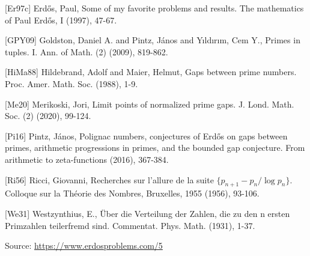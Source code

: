 \documentclass{article}
\begin{document}
 [Er97c] Erd\H{o}s, Paul, Some of my favorite problems and results. The mathematics of Paul Erd\H{o}s, I (1997), 47-67.
 
 [GPY09] Goldston, Daniel A. and Pintz, J\'{a}nos and Y\i ld\i r\i m, Cem Y., Primes in tuples. I. Ann. of Math. (2) (2009), 819-862.
 
 [HiMa88] Hildebrand, Adolf and Maier, Helmut, Gaps between prime numbers. Proc. Amer. Math. Soc. (1988), 1-9.
 
 [Me20] Merikoski, Jori, Limit points of normalized prime gaps. J. Lond. Math. Soc. (2) (2020), 99-124.
 
 [Pi16] Pintz, J\'{a}nos, Polignac numbers, conjectures of Erd\H{o}s on gaps between primes, arithmetic progressions in primes, and the bounded gap conjecture. From arithmetic to zeta-functions (2016), 367-384.
 
 [Ri56] Ricci, Giovanni, Recherches sur l'allure de la suite $\{p_{n+1}-p_n/\log p_n\}$. Colloque sur la Th\'{e}orie des Nombres, Bruxelles, 1955 (1956), 93-106.
 
 [We31] Westzynthius, E., \"{U}ber die Verteilung der Zahlen, die zu den n ersten Primzahlen teilerfremd sind. Commentat. Phys. Math. (1931), 1-37.

\bigskip
\noindent\small{Source: \url{https://www.erdosproblems.com/5}}
\end{document}
